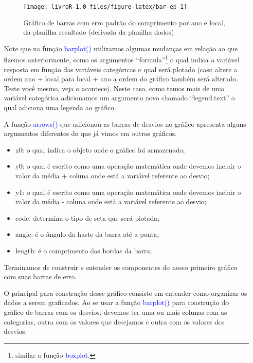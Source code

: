 \documentclass[14pt,titlepage, oneside, openany, a4paper]{book}
\providecommand{\tightlist}{%
  \setlength{\itemsep}{0pt}\setlength{\parskip}{0pt}}
\begin{document}
\begin{figure}[H]

{\centering \texttt{[image: livroR-1.0\_files/figure-latex/bar-ep-1]} 

}

\caption{Gráfico de barras com erro padrão do comprimento por ano e local, da planilha resultado (derivada da planilha dados)}\label{fig:bar-ep}
\end{figure}

Note que na função \textcolor{blue}{barplot()} utilizamos algumas mudanças em relação ao que fizemos anteriormente, como os argumentos ``formula''\footnote{similar a função \textcolor{blue}{boxplot}.} o qual indica a variável resposta em função das variáveis categóricas o qual será plotado (caso altere a ordem ano + local para local + ano a ordem do gráfico também será alterado. Teste você mesmo, veja o acontece). Neste caso, como temos mais de uma variável categórica adicionamos um argumento novo chamado ``legend.text'' o qual adiciona uma legenda ao gráfico.

A função \textcolor{blue}{arrows()} que adicionou as barras de desvios no gráfico apresenta alguns argumentos diferentes do que já vimos em outros gráficos.

\begin{itemize}
\tightlist
\item
  x0: o qual indica o objeto onde o gráfico foi armazenado;
\item
  y0: o qual é escrito como uma operação matemática onde devemos incluir o valor da média + coluna onde está a variável referente ao desvio;
\item
  y1: o qual é escrito como uma operação matemática onde devemos incluir o valor da média - coluna onde está a variável referente ao desvio;
\item
  code: determina o tipo de seta que será plotada;
\item
  angle: é o ângulo da haste da barra até a ponta;
\item
  length: é o comprimento das bordas da barra;
\end{itemize}

Terminamos de construir e entender os componentes do nosso primeiro gráfico com suas barras de erro.

O principal para construção desse gráfico consiste em entender como organizar os dados a serem graficados. Ao se usar a função \textcolor{blue}{barplot()} para construção do gráfico de barras com os desvios, devemos ter uma ou mais colunas com as categorias, outra com os valores que desejamos e outra com os valores dos desvios.
\end{document}
